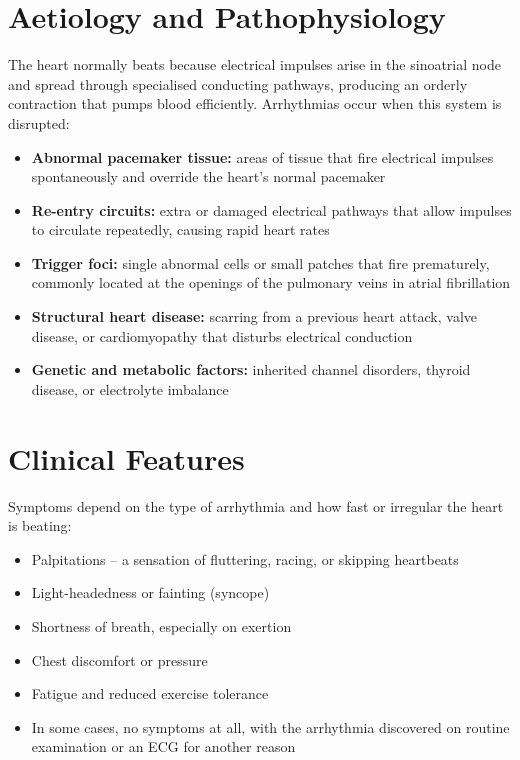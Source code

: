 \section*{Aetiology and Pathophysiology}
The heart normally beats because electrical impulses arise in the sinoatrial node and spread through specialised conducting pathways, producing an orderly contraction that pumps blood efficiently. Arrhythmias occur when this system is disrupted:
\begin{itemize}
    \item \textbf{Abnormal pacemaker tissue:} areas of tissue that fire electrical impulses spontaneously and override the heart's normal pacemaker
    \item \textbf{Re-entry circuits:} extra or damaged electrical pathways that allow impulses to circulate repeatedly, causing rapid heart rates
    \item \textbf{Trigger foci:} single abnormal cells or small patches that fire prematurely, commonly located at the openings of the pulmonary veins in atrial fibrillation
    \item \textbf{Structural heart disease:} scarring from a previous heart attack, valve disease, or cardiomyopathy that disturbs electrical conduction
    \item \textbf{Genetic and metabolic factors:} inherited channel disorders, thyroid disease, or electrolyte imbalance
\end{itemize}

\section*{Clinical Features}
Symptoms depend on the type of arrhythmia and how fast or irregular the heart is beating:
\begin{itemize}
    \item Palpitations -- a sensation of fluttering, racing, or skipping heartbeats
    \item Light-headedness or fainting (syncope)
    \item Shortness of breath, especially on exertion
    \item Chest discomfort or pressure
    \item Fatigue and reduced exercise tolerance
    \item In some cases, no symptoms at all, with the arrhythmia discovered on routine examination or an ECG for another reason
\end{itemize}

